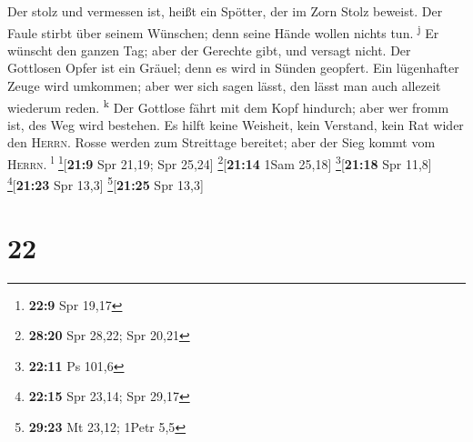  Der stolz und vermessen ist, heißt ein Spötter, der im
Zorn Stolz beweist.  Der Faule stirbt über seinem
Wünschen; denn seine Hände wollen nichts tun. \textsuperscript{j}
 Er wünscht den ganzen Tag; aber der Gerechte gibt, und
versagt nicht.  Der Gottlosen Opfer ist ein Gräuel; denn
es wird in Sünden geopfert.  Ein lügenhafter Zeuge wird
umkommen; aber wer sich sagen lässt, den lässt man auch allezeit
wiederum reden. \textsuperscript{k}  Der Gottlose fährt
mit dem Kopf hindurch; aber wer fromm ist, des Weg wird bestehen.
 Es hilft keine Weisheit, kein Verstand, kein Rat wider
den \textsc{Herrn}.  Rosse werden zum Streittage
bereitet; aber der Sieg kommt vom \textsc{Herrn}. \textsuperscript{l}
\footnote{\textbf{22:9} Spr 19,17}{[}\textbf{21:9} Spr 21,19; Spr
25,24{]} \footnote{\textbf{28:20} Spr 28,22; Spr 20,21}{[}\textbf{21:14}
1Sam 25,18{]} \footnote{\textbf{22:11} Ps 101,6}{[}\textbf{21:18} Spr
11,8{]} \footnote{\textbf{22:15} Spr 23,14; Spr 29,17}{[}\textbf{21:23}
Spr 13,3{]} \footnote{\textbf{29:23} Mt 23,12; 1Petr 5,5}{[}\textbf{21:25}
Spr 13,3{]}

\hypertarget{section-21}{%
\section{22}\label{section-21}}

